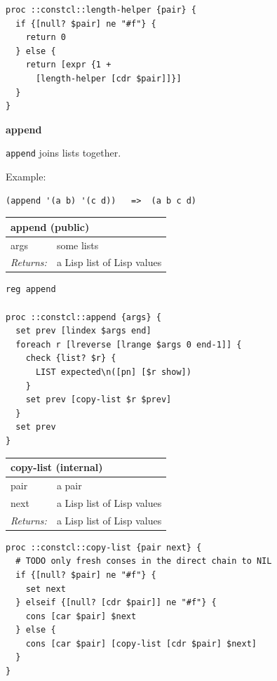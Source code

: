 \documentclass[twoside,9pt]{report}
\begin{document}
\noindent\makebox[\linewidth]{\rule{\linewidth}{0.4pt}}
\begin{lstlisting}
proc ::constcl::length-helper {pair} {
  if {[null? $pair] ne "#f"} {
    return 0
  } else {
    return [expr {1 +
      [length-helper [cdr $pair]]}]
  }
}
\end{lstlisting}
\noindent\makebox[\linewidth]{\rule{\linewidth}{0.4pt}}

\textbf{append}


\texttt{append} joins lists together.


Example:

\noindent\makebox[\linewidth]{\rule{\linewidth}{0.4pt}}
\begin{lstlisting}
(append '(a b) '(c d))   =>  (a b c d)
\end{lstlisting}
\noindent\makebox[\linewidth]{\rule{\linewidth}{0.4pt}}
\begin{tabular}{ |l l| }
\hline
\multicolumn{2}{|l|}{append (public)} \\
\hline
args & some lists \\
\textit{Returns:} & a Lisp list of Lisp values \\
\hline
\end{tabular}

\noindent\makebox[\linewidth]{\rule{\linewidth}{0.4pt}}
\begin{lstlisting}
reg append
 
proc ::constcl::append {args} {
  set prev [lindex $args end]
  foreach r [lreverse [lrange $args 0 end-1]] {
    check {list? $r} {
      LIST expected\n([pn] [$r show])
    }
    set prev [copy-list $r $prev]
  }
  set prev
}
\end{lstlisting}
\noindent\makebox[\linewidth]{\rule{\linewidth}{0.4pt}}
\begin{tabular}{ |l l| }
\hline
\multicolumn{2}{|l|}{copy-list (internal)} \\
\hline
pair & a pair \\
next & a Lisp list of Lisp values \\
\textit{Returns:} & a Lisp list of Lisp values \\
\hline
\end{tabular}

\noindent\makebox[\linewidth]{\rule{\linewidth}{0.4pt}}
\begin{lstlisting}
proc ::constcl::copy-list {pair next} {
  # TODO only fresh conses in the direct chain to NIL
  if {[null? $pair] ne "#f"} {
    set next
  } elseif {[null? [cdr $pair]] ne "#f"} {
    cons [car $pair] $next
  } else {
    cons [car $pair] [copy-list [cdr $pair] $next]
  }
}
\end{lstlisting}
\noindent\makebox[\linewidth]{\rule{\linewidth}{0.4pt}}
\end{document}
